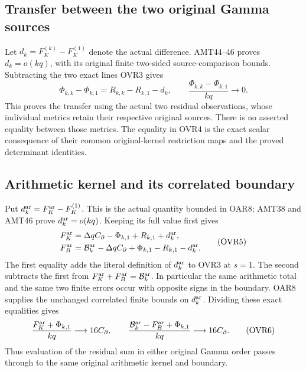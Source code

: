 \documentclass[11pt,a4paper]{article}
\begin{document}
\subsection{Transfer between the two original Gamma sources}
Let $d_k=F_K^{(k)}-F_K^{(1)}$ denote the actual difference.
AMT44--46 proves $d_k=o(kq)$, with its original finite two-sided
source-comparison bounds. Subtracting the two exact lines OVR3 gives
\[
 \Phi_{k,k}-\Phi_{k,1}=R_{k,k}-R_{k,1}-d_k,
 \qquad
 \frac{\Phi_{k,k}-\Phi_{k,1}}{kq}\longrightarrow0.
 \tag{OVR4}
\]
This proves the transfer using the actual two residual observations,
whose individual metrics retain their respective original sources.
There is no asserted equality between those metrics. The equality in
OVR4 is the exact scalar consequence of their common original-kernel
restriction maps and the proved determinant identities.

\subsection{Arithmetic kernel and its correlated boundary}
Put $d_k^{\rm ar}=F_K^{\rm ar}-F_K^{(1)}$. This is the actual
quantity bounded in OAR8; AMT38 and AMT46 prove
$d_k^{\rm ar}=o(kq)$. Keeping its full value first gives
\[
 \begin{split}
 F_K^{\rm ar}
    &=\Delta q C_\partial-\Phi_{k,1}+R_{k,1}+d_k^{\rm ar},\\
 F_B^{\rm ar}
    &=\mathcal B_k^{\rm ar}-\Delta q C_\partial
          +\Phi_{k,1}-R_{k,1}-d_k^{\rm ar}.
 \end{split}\tag{OVR5}
\]
The first equality adds the literal definition of $d_k^{\rm ar}$
to OVR3 at $s=1$. The second subtracts the first from
$F_K^{\rm ar}+F_B^{\rm ar}=\mathcal B_k^{\rm ar}$.
In particular the same arithmetic total and the same two finite
errors occur with opposite signs in the boundary. OAR8 supplies
the unchanged correlated finite bounds on $d_k^{\rm ar}$.
Dividing these exact equalities gives
\[
 \frac{F_K^{\rm ar}+\Phi_{k,1}}{kq}\longrightarrow16C_\partial,
 \qquad
 \frac{\mathcal B_k^{\rm ar}-F_B^{\rm ar}+\Phi_{k,1}}{kq}
                  \longrightarrow16C_\partial.
 \tag{OVR6}
\]
Thus evaluation of the residual sum in either original Gamma order
passes through to the same original arithmetic kernel and boundary.
\end{document}
